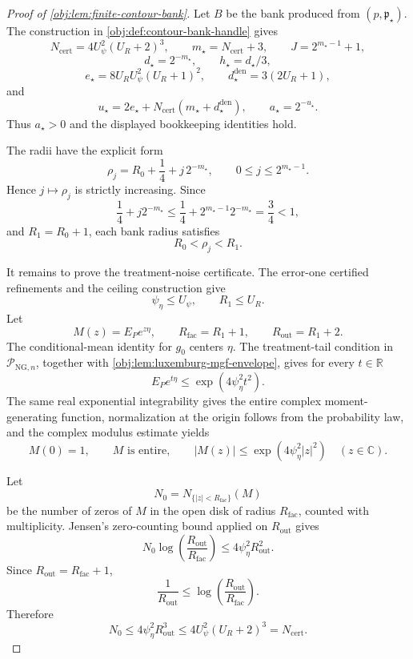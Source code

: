 \begin{proof}[Proof of \cref{obj:lem:finite-contour-bank}]
Let \(B\) be the bank produced from \((p,\mathfrak p_\star)\).  The construction in \cref{obj:def:contour-bank-handle} gives
\[
N_{\mathrm{cert}}=4U_\psi^2(U_R+2)^3,\qquad
m_\star=N_{\mathrm{cert}}+3,\qquad
J=2^{m_\star-1}+1,
\]
\[
d_\star=2^{-m_\star},\qquad h_\star=d_\star/3,
\]
\[
e_\star=8U_RU_\psi^2(U_R+1)^2,\qquad
d_\star^{\mathrm{den}}=3(2U_R+1),
\]
and
\[
u_\star=2e_\star+N_{\mathrm{cert}}(m_\star+d_\star^{\mathrm{den}}),
\qquad
a_\star=2^{-u_\star}.
\]
Thus \(a_\star>0\) and the displayed bookkeeping identities hold. %

The radii have the explicit form
\[
\rho_j=R_0+\frac14+j\,2^{-m_\star},
\qquad 0\le j\le 2^{m_\star-1}.
\]
Hence \(j\mapsto\rho_j\) is strictly increasing.  Since
\[
\frac14+j2^{-m_\star}\le \frac14+2^{m_\star-1}2^{-m_\star}=\frac34<1,
\]
and \(R_1=R_0+1\), each bank radius satisfies
\[
R_0<\rho_j<R_1.
\]

It remains to prove the treatment-noise certificate.  The error-one certified refinements and the ceiling construction give
\[
\psi_\eta\le U_\psi,\qquad R_1\le U_R.
\]
Let
\[
M(z)=E_Pe^{z\eta},\qquad R_{\mathrm{fac}}=R_1+1,
\qquad R_{\mathrm{out}}=R_1+2.
\]
The conditional-mean identity for \(g_0\) centers \(\eta\).  The treatment-tail condition in \(\mathcal P_{\mathrm{NG},n}\), together with \cref{obj:lem:luxemburg-mgf-envelope}, gives for every \(t\in\mathbb R\)
\[
E_P e^{t\eta}\le \exp(4\psi_\eta^2t^2).
\]
The same real exponential integrability gives the entire complex moment-generating function, normalization at the origin follows from the probability law, and the complex modulus estimate yields
\[
M(0)=1,\qquad M\text{ is entire},\qquad
|M(z)|\le \exp(4\psi_\eta^2|z|^2)
\quad (z\in\mathbb C).
\]

Let
\[
N_0=N_{\{|z|<R_{\mathrm{fac}}\}}(M)
\]
be the number of zeros of \(M\) in the open disk of radius \(R_{\mathrm{fac}}\), counted with multiplicity.  Jensen's zero-counting bound applied on \(R_{\mathrm{out}}\) gives
\[
N_0\log\!\left(\frac{R_{\mathrm{out}}}{R_{\mathrm{fac}}}\right)
\le 4\psi_\eta^2R_{\mathrm{out}}^2.
\]
Since \(R_{\mathrm{out}}=R_{\mathrm{fac}}+1\),
\[
\frac1{R_{\mathrm{out}}}
\le
\log\!\left(\frac{R_{\mathrm{out}}}{R_{\mathrm{fac}}}\right).
\]
Therefore
\[
N_0
\le 4\psi_\eta^2R_{\mathrm{out}}^3
\le 4U_\psi^2(U_R+2)^3
=N_{\mathrm{cert}}.
\]


\end{proof}
